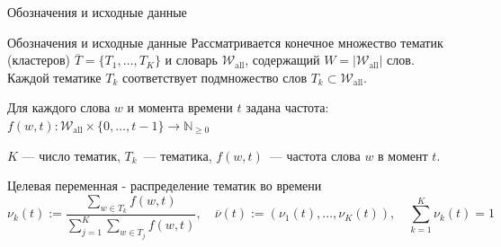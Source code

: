 \documentclass{beamer}
\begin{document}
\begin{frame}{Обозначения и исходные данные}
  \vspace{-0.3cm}
  \begin{block}{Обозначения и исходные данные}
    Рассматривается конечное множество тематик (кластеров) $\overline{T} = \{T_1, \dots, T_K\}$ и словарь $\mathcal{W}_{\mathrm{all}}$, содержащий $W = |\mathcal{W}_{\mathrm{all}}|$ слов. Каждой тематике $T_k$ соответствует подмножество слов $T_k \subset \mathcal{W}_{\mathrm{all}}$. 

    Для каждого слова $w$ и момента времени $t$ задана частота:
    \footnotesize
    \(
    f(w,t)\colon \mathcal{W}_{\mathrm{all}} \times \{0, \dots, t{-}1\} \to \mathbb{N}_{\ge 0}
    \)

    $K$ — число тематик, $T_k$~— тематика, $f(w,t)$~— частота слова $w$ в момент $t$.
        \normalsize
  \end{block}

  \begin{block}{Целевая переменная - распределение тематик во времени}
    \vspace{-0.4cm}
    \footnotesize
    \[
    \nu_k(t) := \frac{\sum_{w \in T_k} f(w,t)}{\sum_{j=1}^K \sum_{w \in T_j} f(w,t)},\quad \overline{\nu}(t) := (\nu_1(t), \dots, \nu_K(t)),\quad \sum_{k=1}^K \nu_k(t) = 1
    \]
    \normalsize
  \end{block}
\end{frame}



\end{document}

